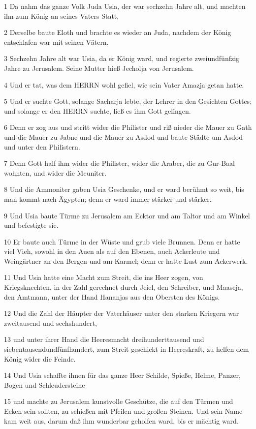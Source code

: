 \par 1 Da nahm das ganze Volk Juda Usia, der war sechzehn Jahre alt, und machten ihn zum König an seines Vaters Statt,
\par 2 Derselbe baute Eloth und brachte es wieder an Juda, nachdem der König entschlafen war mit seinen Vätern.
\par 3 Sechzehn Jahre alt war Usia, da er König ward, und regierte zweiundfünfzig Jahre zu Jerusalem. Seine Mutter hieß Jecholja von Jerusalem.
\par 4 Und er tat, was dem HERRN wohl gefiel, wie sein Vater Amazja getan hatte.
\par 5 Und er suchte Gott, solange Sacharja lebte, der Lehrer in den Gesichten Gottes; und solange er den HERRN suchte, ließ es ihm Gott gelingen.
\par 6 Denn er zog aus und stritt wider die Philister und riß nieder die Mauer zu Gath und die Mauer zu Jabne und die Mauer zu Asdod und baute Städte um Asdod und unter den Philistern.
\par 7 Denn Gott half ihm wider die Philister, wider die Araber, die zu Gur-Baal wohnten, und wider die Meuniter.
\par 8 Und die Ammoniter gaben Usia Geschenke, und er ward berühmt so weit, bis man kommt nach Ägypten; denn er ward immer stärker und stärker.
\par 9 Und Usia baute Türme zu Jerusalem am Ecktor und am Taltor und am Winkel und befestigte sie.
\par 10 Er baute auch Türme in der Wüste und grub viele Brunnen. Denn er hatte viel Vieh, sowohl in den Auen als auf den Ebenen, auch Ackerleute und Weingärtner an den Bergen und am Karmel; denn er hatte Lust zum Ackerwerk.
\par 11 Und Usia hatte eine Macht zum Streit, die ins Heer zogen, von Kriegsknechten, in der Zahl gerechnet durch Jeiel, den Schreiber, und Maaseja, den Amtmann, unter der Hand Hananjas aus den Obersten des Königs.
\par 12 Und die Zahl der Häupter der Vaterhäuser unter den starken Kriegern war zweitausend und sechshundert,
\par 13 und unter ihrer Hand die Heeresmacht dreihunderttausend und siebentausendundfünfhundert, zum Streit geschickt in Heereskraft, zu helfen dem König wider die Feinde.
\par 14 Und Usia schaffte ihnen für das ganze Heer Schilde, Spieße, Helme, Panzer, Bogen und Schleudersteine
\par 15 und machte zu Jerusalem kunstvolle Geschütze, die auf den Türmen und Ecken sein sollten, zu schießen mit Pfeilen und großen Steinen. Und sein Name kam weit aus, darum daß ihm wunderbar geholfen ward, bis er mächtig ward.
